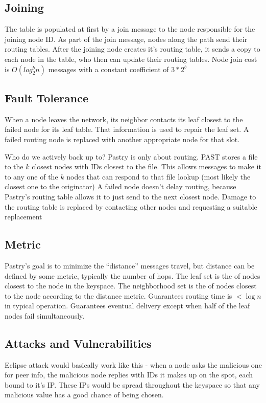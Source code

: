 \documentclass[10pt,letterpaper,twoside]{report}
\begin{document}
\subsection*{Joining}
The table is populated at first by a join message to the node responsible for the joining node ID.  
As part of the join message, nodes  along the path send their routing tables.  
After the joining node creates it's routing table, it sends a copy to each node in the table, who then can update their routing tables.   
Node join cost is $O(log_{2}^{b} n)$ messages  with  a constant  coefficient  of $3*2^{b}$




\subsection*{Fault Tolerance}

When a node leaves the network, its neighbor contacts its leaf closest to the failed node  for its leaf table.  That information is used to repair the leaf set.  A failed routing node is replaced with another appropriate node for that slot.  

Who do we actively back up to? 
Pastry is only about routing.
PAST stores a file to the $k$ closest nodes with IDs closest to the file.  
This allows messages to make it to any one of the $k$ nodes that can respond to that file lookup (most likely the closest one to the originator)
A failed node doesn't delay  routing, because Pastry's routing table allows it to just send to the next closest node.  
Damage to the routing table is replaced by contacting other nodes and requesting a suitable replacement




\subsection*{Metric}
Pastry's goal is to minimize the ``distance'' messages travel, but distance can be defined by some metric, typically the number of hops.
The leaf set is the  of nodes closest to the node in the keyspace.  
The neighborhood set is the of nodes closest to the node according to the distance metric. 
Guarantees routing time is  $<\log n$ in typical operation.  
Guarantees eventual delivery except when half of the leaf nodes fail simultaneously.



\subsection*{Attacks and Vulnerabilities}
Eclipse attack would basically work like this -  when a node asks the malicious one for peer info, the malicious node replies with IDs it makes up on the spot, each bound to it's IP. These IPs would be spread throughout the keyspace so that any malicious value has a good chance of being chosen.
\end{document}
